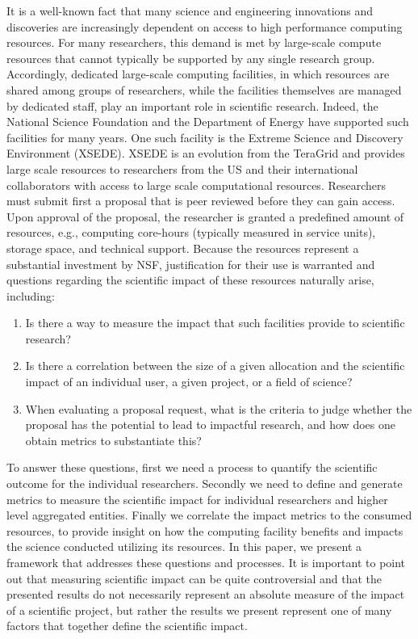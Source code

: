 \documentclass{tex/sig-alternate}
\begin{document}
It is a well-known fact that many science and engineering innovations and discoveries are increasingly dependent on access to high performance computing resources. For many researchers, this demand is met by large-scale compute resources that cannot typically be supported by any single research group. Accordingly, dedicated large-scale computing facilities, in which resources are shared among groups of researchers, while the facilities themselves are managed by dedicated staff, play an important role in scientific research. Indeed, the National Science Foundation and the Department of Energy have supported such facilities for many years. One such facility is the Extreme Science and Discovery Environment (XSEDE). XSEDE is an evolution from the TeraGrid \cite{www-xsede} and provides large scale resources to researchers from the US and their international collaborators with access to large scale computational resources. Researchers must submit first a proposal that is peer reviewed before they can gain access. Upon approval of the proposal, the researcher is granted a predefined amount of resources, e.g., computing core-hours (typically measured in service units), storage space, and technical support. Because the resources represent a substantial investment by NSF, justification for their use is warranted and questions regarding the scientific impact of these resources naturally arise, including:

\begin{enumerate} 
\item Is there a way to measure the impact that such facilities provide to scientific research?

\item Is there a correlation between the size of a given allocation and the scientific impact of an individual user, a given project, or a field of science?  
 
\item When evaluating a proposal request, what is the criteria to judge whether the proposal has the potential to lead to impactful research, and how does one obtain metrics to substantiate this? 
\end{enumerate} 

To answer these questions, first we need a process to quantify the scientific outcome for the individual researchers. Secondly we need to define and generate metrics to measure the scientific impact for individual researchers and higher level aggregated entities. Finally we correlate the impact metrics to the consumed resources, to provide insight on how the computing facility benefits and impacts the science conducted utilizing its resources. In this paper, we present a framework that addresses these questions and processes. It is important to point out that measuring scientific impact can be quite controversial and that the presented results do not necessarily represent an absolute measure of the impact of a scientific project, but rather the results we present represent one of many factors that together define the scientific impact.
\end{document}
